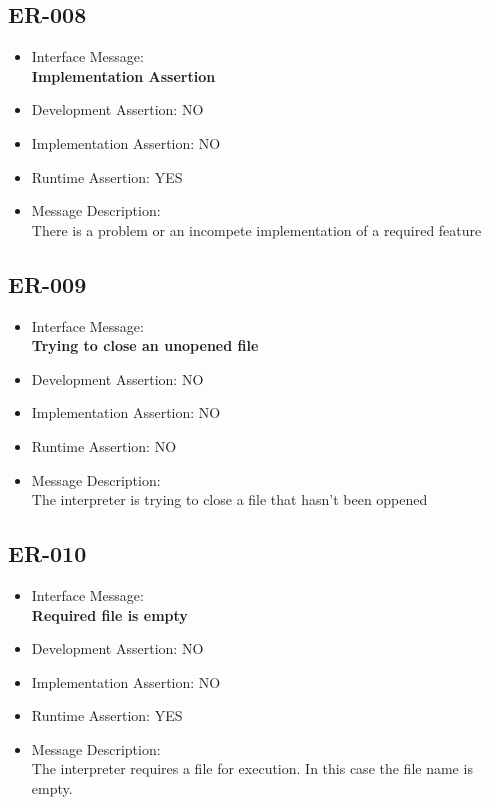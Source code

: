 \subsection{ER-008}
\begin{itemize}
  \item Interface Message:\\[1em]\textbf{Implementation Assertion}
  \item Development Assertion: NO
  \item Implementation Assertion: NO
  \item Runtime Assertion: YES
  \item Message Description:\\[1em]There is a problem or an incompete implementation of a required feature
\end{itemize}

\subsection{ER-009}
\begin{itemize}
  \item Interface Message:\\[1em]\textbf{Trying to close an unopened file}
  \item Development Assertion: NO
  \item Implementation Assertion: NO
  \item Runtime Assertion: NO
  \item Message Description:\\[1em]The interpreter is trying to close a file that hasn't been oppened
\end{itemize}

\subsection{ER-010}
\begin{itemize}
  \item Interface Message:\\[1em]\textbf{Required file is empty}
  \item Development Assertion: NO
  \item Implementation Assertion: NO
  \item Runtime Assertion: YES
  \item Message Description:\\[1em]The interpreter requires a file for execution. In this case the file name is empty.
\end{itemize}

